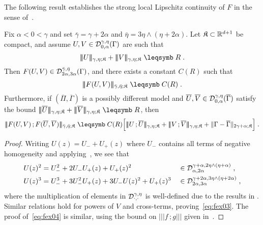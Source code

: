 \documentclass[reqno,11pt]{article}
\def\normDgamma#1{|\!|\!|#1|\!|\!|}
\def\seminormff#1#2{|\!|\!|#1\,\mathord{;}\,#2|\!|\!|}
\def\fraK{\mathfrak{K}}
\def\Gammabar{\overline\Gamma}
\def\Pibar{\overline\Pi}
\begin{document}
The following result establishes the strong local Lipschitz continuity of $F$
in the sense of~\cite[Section~7.3]{Hairer2014}. 

\begin{prop}
\label{prop:f_Lipschitz}
Fix $\alpha < 0 < \gamma$ and set $\bar\gamma=\gamma+2\alpha$ and 
$\bar\eta = 3\eta \wedge(\eta+2\alpha)$. Let $\fraK\subset\R^{d+1}$ be
compact, and assume $U,V\in{\mathcal D}^{\gamma,\eta}_{0,\alpha}(\Gamma)$ are such that
\begin{equation}
 \label{eq:fex02}
 \normDgamma{U}_{\gamma,\eta;\fraK} + \normDgamma{V}_{\gamma,\eta;\fraK} 
 \leqs R\;.
\end{equation} 
Then $F(U,V)\in{\mathcal D}^{\bar\gamma,\bar\eta}_{2\alpha,3\alpha}(\Gamma)$, and there
exists a constant $C(R)$ such that 
\begin{equation}
 \label{eq:fex03}
 \normDgamma{F(U,V)}_{\bar\gamma,\bar\eta;\fraK} \leqs C(R)\;.
\end{equation} 
Furthermore, if $(\Pibar,\Gammabar)$ is a possibly different model and
$\overline U,\overline V\in\cD^{\gamma,\eta}_{0,\alpha}(\Gammabar)$ satisfy 
the bound $\normDgamma{\overline U}_{\gamma,\eta;\fraK} +
\normDgamma{\overline V}_{\gamma,\eta;\fraK} \leqs R$, then
\begin{equation}
 \label{eq:fex04}
 \seminormff{F(U,V)}{F(\overline U,\overline V)}_{\bar\gamma,\bar\eta;\fraK}
\leqs 
C(R) \Bigbrak{\seminormff{U}{\overline U}_{\gamma,\eta;\fraK} +
\seminormff{V}{\overline V}_{\gamma,\eta;\fraK}
+ \norm{\Gamma - \Gammabar}_{2\gamma+\alpha;\fraK}}\;.
\end{equation} 
\end{prop}
%
\begin{proof}
Writing $U(z)=U_-+U_+(z)$ where $U_-$ contains all terms of negative
homogeneity and applying~\cite[Prop.~6.12]{Hairer2014}, we see that 
\begin{alignat*}{3}
U(z)^2 &= U_-^2 + 2 U_- U_+(z) + U_+(z)^2 &&\in
{\mathcal D}^{\gamma+\alpha,2\eta\wedge(\eta+\alpha)}_{\alpha,2\alpha}\;, \\
U(z)^3 &= U_-^3 + 3 U_-^2 U_+(z) + 3 U_- U(z)^2 + U_+(z)^3 &&\in 
{\mathcal D}^{\gamma+2\alpha,3\eta\wedge(\eta+2\alpha)}_{2\alpha,3\alpha}\;,
\end{alignat*}
where the multiplication of elements in ${\mathcal D}^{\gamma,\eta}_{\cdot,\cdot}$ is 
well-defined due to the results in \cite[Sec.~4]{Hairer2014}. 
Similar relations hold for powers of $V$ and cross-terms,
proving~\eqref{eq:fex03}. The proof of~\eqref{eq:fex04} is similar, using the
bound on $\seminormff{f}{g}$ given in~\cite[Prop.~6.12]{Hairer2014}.
\end{proof}
\end{document}
